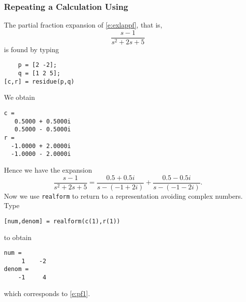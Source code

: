 \documentclass{ximera}
\begin{document}
\subsubsection*{Repeating a Calculation Using \Matlab}

The partial fraction expansion of \eqref{e:exlappf}, that is,
\[
\frac{s-1}{s^2+2s+5}
\]
is found by typing
\begin{verbatim}
    p = [2 -2];
    q = [1 2 5];
[c,r] = residue(p,q)
\end{verbatim}
We obtain
\begin{verbatim}
c =
   0.5000 + 0.5000i
   0.5000 - 0.5000i
r =
  -1.0000 + 2.0000i
  -1.0000 - 2.0000i
\end{verbatim}
Hence we have the expansion
\[
\frac{s-1}{s^2+2s+5}= \frac{0.5+0.5i}{s-(-1+2i)}+\frac{0.5-0.5i}{s-(-1-2i)}.
\]
Now we use {\tt realform} 
to return to a representation avoiding complex numbers.  Type
\begin{verbatim}
[num,denom] = realform(c(1),r(1))
\end{verbatim}
to obtain
\begin{verbatim}
num = 
     1    -2
denom = 
    -1     4
\end{verbatim}
which corresponds to \eqref{e:pf1}.

\EXER

\end{document}

